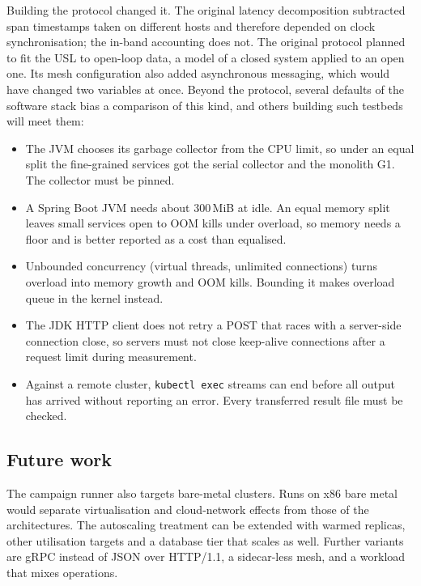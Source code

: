 Building the protocol changed it. The original latency decomposition subtracted span timestamps taken on different
hosts and therefore depended on clock synchronisation; the in-band accounting does not. The original protocol planned to fit
the USL to open-loop data, a model of a closed system applied to an open one. Its mesh configuration also added
asynchronous messaging, which would have changed two variables at once. Beyond the protocol, several defaults of
the software stack bias a comparison of this kind, and others building such testbeds will meet them:
\begin{itemize}
\item The JVM chooses its garbage collector from the CPU limit, so under an equal split the fine-grained services
got the serial collector and the monolith G1. The collector must be pinned.
\item A Spring Boot JVM needs about 300\,MiB at idle. An equal memory split leaves small services open to OOM kills
under overload, so memory needs a floor and is better reported as a cost than equalised.
\item Unbounded concurrency (virtual threads, unlimited connections) turns overload into memory growth and OOM
kills. Bounding it makes overload queue in the kernel instead.
\item The JDK HTTP client does not retry a POST that races with a server-side connection close, so servers must not
close keep-alive connections after a request limit during measurement.
\item Against a remote cluster, \texttt{kubectl exec} streams can end before all output has arrived without
reporting an error. Every transferred result file must be checked.
\end{itemize}

\subsection{Future work}

The campaign runner also targets bare-metal clusters. Runs on x86 bare metal would separate virtualisation and
cloud-network effects from those of the architectures. The autoscaling treatment can be extended with warmed
replicas, other utilisation targets and a database tier that scales as well. Further variants are gRPC instead
of JSON over HTTP/1.1, a sidecar-less mesh, and a workload that mixes operations.
